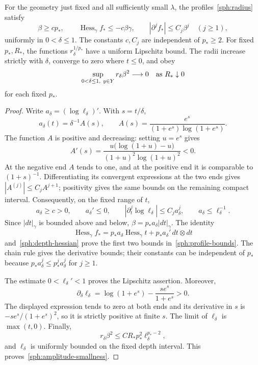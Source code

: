 \begin{lemma}\label{sph:profiles}
For the geometry just fixed and all sufficiently small $\lambda$, the
profiles~\eqref{sph:radius} satisfy
\begin{equation}\label{sph:profile-bounds}
 \beta\ge cp_*,\qquad
 \operatorname{Hess}_\gamma f_*\le-c\beta\gamma,
 \qquad |\partial^j f_*|\le C_j\beta^j\quad(j\ge1),
\end{equation}
uniformly in $0<\delta\le1$.  The constants $c,C_j$ are independent of
$p_*\ge2$.  For fixed $p_*,R_*$, the functions $r_\delta^{1/p_*}$ have
a uniform Lipschitz bound.  The radii increase strictly with $\delta$,
converge to zero where $t\le0$, and obey
\begin{equation}\label{sph:amplitude-smallness}
 \sup_{0<\delta\le1,\ y\in Y}r_\delta\beta^2
 \longrightarrow0\quad\hbox{as }R_*\downarrow0
\end{equation}
for each fixed $p_*$.
\end{lemma}

\begin{proof}
Write $a_\delta=(\log\ell_\delta)'$.  With $s=t/\delta$,
\[
 a_\delta(t)=\delta^{-1}A(s),\qquad
 A(s)=\frac{e^s}{(1+e^s)\log(1+e^s)}.
\]
The function $A$ is positive and decreasing: setting $u=e^s$ gives
\[
 A'(s)=\frac{u\bigl(\log(1+u)-u\bigr)}
              {(1+u)^2\log(1+u)^2}<0.
\]
At the negative end $A$ tends to one, and at the positive end it is
comparable to $(1+s)^{-1}$.  Differentiating its convergent expressions
at the two ends gives $|A^{(j)}|\le C_jA^{j+1}$; positivity gives the
same bounds on the remaining compact interval.  Consequently, on the
fixed range of $t$,
\[
 a_\delta\ge c>0,\qquad a_\delta'\le0,\qquad
 |\partial_t^j\log\ell_\delta|\le C_j a_\delta^j,
 \qquad a_\delta\le\ell_\delta^{-1}.
\]
Since $|dt|_\gamma$ is bounded above and below,
$\beta=p_*a_\delta|dt|_\gamma$.  The identity
\[
 \operatorname{Hess}_\gamma f_*
   =p_*a_\delta\operatorname{Hess}_\gamma t
       +p_*a_\delta'\,dt\otimes dt
\]
and~\eqref{sph:depth-hessian} prove the first two bounds
in~\eqref{sph:profile-bounds}.  The chain rule gives the derivative
bounds; their constants can be independent of $p_*$ because
$p_*a_\delta^j\le p_*^j a_\delta^j$ for $j\ge1$.

The estimate $0<\ell_\delta'<1$ proves the Lipschitz assertion.
Moreover,
\[
 \partial_\delta\ell_\delta
   =\log(1+e^s)-\frac{s e^s}{1+e^s}>0.
\]
The displayed expression tends to zero at both ends and its derivative
in $s$ is $-s e^s/(1+e^s)^2$, so it is strictly positive at finite $s$.
The limit of $\ell_\delta$ is $\max(t,0)$.  Finally,
\[
 r_\delta\beta^2\le C R_*p_*^2\ell_\delta^{p_*-2},
\]
and $\ell_\delta$ is uniformly bounded on the fixed depth interval.
This proves~\eqref{sph:amplitude-smallness}.
\end{proof}

